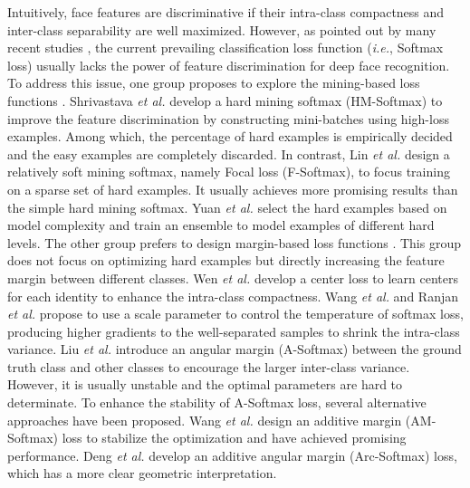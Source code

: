 \documentclass[10pt,twocolumn,letterpaper]{article}
\begin{document}
Intuitively, face features are discriminative if their intra-class compactness and inter-class separability are well maximized. However, as pointed out by many recent studies \cite{Center,NormFace,SphereFace,AM-Softmax,EM-Softmax,Arc-Softmax}, the current prevailing classification loss function (\textit{i.e.}, Softmax loss) usually lacks the power of feature discrimination for deep face recognition. To address this issue, one group proposes to explore the mining-based loss functions \cite{OHEM,Focal,Lift,Yuan}. Shrivastava \textit{et al.} \cite{OHEM} develop a hard mining softmax (HM-Softmax) to improve the feature discrimination by constructing mini-batches using high-loss examples. Among which, the percentage of hard examples is empirically decided and the easy examples are completely discarded. In contrast, Lin \textit{et al.} \cite{Focal} design a relatively soft mining softmax, namely Focal loss (F-Softmax), to focus training on a sparse set of hard examples. It usually achieves more promising results than the simple hard mining softmax. Yuan \textit{et al.} \cite{Yuan} select the hard examples based on model complexity and train an ensemble to model examples of different hard levels. The other group prefers to design margin-based loss functions \cite{SphereFace,AM-Softmax,Arc-Softmax}. This group does not focus on optimizing hard examples but directly increasing the feature margin between different classes. Wen \textit{et al.} \cite{Center} develop a center loss to learn centers for each identity to enhance the intra-class compactness. Wang \textit{et al.} \cite{NormFace} and Ranjan \textit{et al.} \cite{L2Constrain} propose to use a scale parameter to control the temperature of softmax loss, producing higher gradients to the well-separated samples to shrink the intra-class variance. Liu \textit{et al.} \cite{L-softmax,SphereFace}  introduce an angular margin (A-Softmax) between the ground truth class and other classes to encourage the larger inter-class variance. However, it is usually unstable and the optimal parameters are hard to determinate. To enhance the stability of A-Softmax loss, several alternative approaches \cite{AM-Softmax,EM-Softmax,Cosine,Arc-Softmax} have been proposed. Wang \textit{et al.} \cite{AM-Softmax} design an additive margin (AM-Softmax) loss to stabilize the optimization and have achieved promising performance. Deng \textit{et al.} \cite{Arc-Softmax}  develop an additive angular margin (Arc-Softmax) loss, which has a more clear geometric interpretation.
\end{document}
